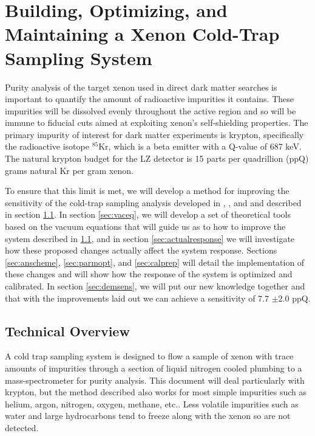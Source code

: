 \chapter{Building, Optimizing, and Maintaining a Xenon Cold-Trap Sampling System} \label{chap:sampling}
Purity analysis of the target xenon used in direct dark matter searches is important to quantify the amount of radioactive impurities it contains. These impurities will be dissolved evenly throughout the active region and so will be immune to fiducial cuts aimed at exploiting xenon's self-shielding properties. The primary impurity of interest for dark matter experiments is krypton, specifically the radioactive isotope $^{85}$Kr, which is a beta emitter with a Q-value of 687 keV. The natural krypton budget for the LZ detector is 15 parts per quadrillion (ppQ) grams natural Kr per gram xenon. 

To ensure that this limit is met, we will develop a method for improving the sensitivity of the cold-trap sampling analysis developed in \cite{sampling_doug}, \cite{sampling_EXO}, and \cite{sampling_dm} and described in section \ref{sec:techoverview}. In section \ref{sec:vaceq}, we will develop a set of theoretical tools based on the vacuum equations that will guide us as to how to improve the system described in \ref{sec:techoverview}, and in section \ref{sec:actualresponse} we will investigate how these proposed changes actually affect the system response. Sections \ref{sec:anscheme}, \ref{sec:parmopt}, and \ref{sec:calprep} will detail the implementation of these changes and will show how the response of the system is optimized and calibrated. In section \ref{sec:demsens}, we will put our new knowledge together and that with the improvements laid out we can achieve a sensitivity of 7.7 $\pm2.0$ ppQ.

\section{Technical Overview}\label{sec:techoverview}
A cold trap sampling system is designed to flow a sample of xenon with trace amounts of impurities through a section of liquid nitrogen cooled plumbing to a mass-spectrometer for purity analysis. This document will deal particularly with krypton, but the method described also works for most simple impurities  such as helium, argon, nitrogen, oxygen, methane, etc.. Less volatile impurities such as water and large hydrocarbons tend to freeze along with the xenon so are not detected. 

